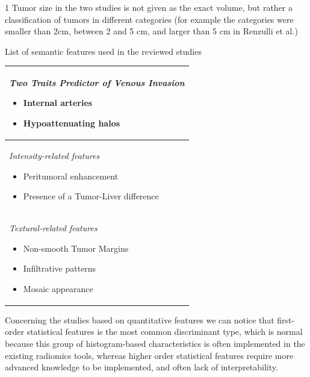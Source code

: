 \documentclass[]{article}
\renewcommand{\arraystretch}{5}
\begin{document}
\begin{minipage}{17cm}
\begin{threeparttable}
\begin{tabularx}{8cm}{|X|}
\hline
\end{tabularx}
\begin{tablenotes}
\item[1] {Tumor size in the two studies is not given as the exact volume, but
rather a classification of tumors in different categories (for example
the categories were smaller than 2cm, between 2 and 5 cm, and larger
than 5 cm in Renzulli et al.\cite{Renzulli2016})} 
\end{tablenotes}
\end{threeparttable}
\hspace{0.5cm}
\begin{threeparttable}
\caption{List of semantic features used in the reviewed studies}
\label{tab:SemanticFeatures}
\begin{tabularx}{7.5cm}{|X|}
\hline
\emph{Two Traits Predictor of Venous Invasion}
\begin{itemize}
\item Internal arteries \cite{Renzulli2016,Kuo2007,Peng2018,Segal2007,Banerjee2015,Taouli2017}
\item Hypoattenuating halos \cite{Renzulli2016,Peng2018,Segal2007,Banerjee2015}
\end{itemize} \\ \hline
\emph{Intensity-related features}
\begin{itemize}
\item Peritumoral enhancement \cite{Renzulli2016}
\item Presence of a Tumor-Liver difference \cite{Banerjee2015}
\end{itemize} \\ \hline
\emph{Textural-related features}
\begin{itemize}
\item Non-smooth Tumor Margins \cite{Renzulli2016,Kuo2007,Peng2018}
\item Infiltrative patterns \cite{Taouli2017}
\item Mosaic appearance \cite{Taouli2017}
\end{itemize} \\
\hline
\end{tabularx}
\end{threeparttable}

\end{minipage}
\renewcommand{\arraystretch}{5}


Concerning the studies based on quantitative features we can notice that
first-order statistical features is the most common discriminant type,
which is normal because this group of histogram-based characteristics is
often implemented in the existing radiomics tools, whereas higher order
statistical features require more advanced knowledge to be implemented,
and often lack of interpretability.
\end{document}
